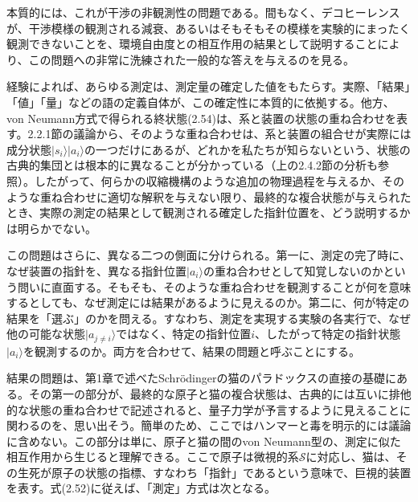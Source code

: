 \hypertarget{srcpage:57}{}\label{srcpage:57}
本質的には、これが干渉の非観測性の問題である。間もなく、デコヒーレンスが、干渉模様の観測される減衰、あるいはそもそもその模様を実験的にまったく観測できないことを、環境自由度との相互作用の結果として説明することにより、この問題への非常に洗練された一般的な答えを与えるのを見る。

経験によれば、あらゆる測定は、測定量の確定した値をもたらす。実際、「結果」「値」「量」などの語の定義自体が、この確定性に本質的に依拠する。他方、von Neumann方式で得られる終状態(2.54)は、系と装置の状態の重ね合わせを表す。2.2.1節の議論から、そのような重ね合わせは、系と装置の組合せが実際には成分状態$\lvert s_i\rangle\lvert a_i\rangle$の一つだけにあるが、どれかを私たちが知らないという、状態の古典的集団とは根本的に異なることが分かっている（上の2.4.2節の分析も参照）。したがって、何らかの収縮機構のような追加の物理過程を与えるか、そのような重ね合わせに適切な解釈を与えない限り、最終的な複合状態が与えられたとき、実際の測定の結果として観測される確定した指針位置を、どう説明するかは明らかでない。

この問題はさらに、異なる二つの側面に分けられる。第一に、測定の完了時に、なぜ装置の指針を、異なる指針位置$\lvert a_i\rangle$の重ね合わせとして知覚しないのかという問いに直面する。そもそも、そのような重ね合わせを観測することが何を意味するとしても、なぜ測定には結果があるように見えるのか。第二に、何が特定の結果を「選ぶ」のかを問える。すなわち、測定を実現する実験の各実行で、なぜ他の可能な状態$\lvert a_{j\ne i}\rangle$ではなく、特定の指針位置$i$、したがって特定の指針状態$\lvert a_i\rangle$を観測するのか。両方を合わせて、結果の問題と呼ぶことにする。

結果の問題は、第1章で述べたSchrödingerの猫のパラドックスの直接の基礎にある。その第一の部分が、最終的な原子と猫の複合状態は、古典的には互いに排他的な状態の重ね合わせで記述されると、量子力学が予言するように見えることに関わるのを、思い出そう。簡単のため、ここではハンマーと毒を明示的には議論に含めない。この部分は単に、原子と猫の間のvon Neumann型の、測定に似た相互作用から生じると理解できる。ここで原子は微視的系$\mathcal S$に対応し、猫は、その生死が原子の状態の指標、すなわち「指針」であるという意味で、巨視的装置を表す。式(2.52)に従えば、「測定」方式は次となる。

